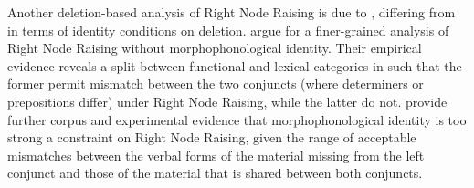 


%

Another deletion-based analysis of Right Node Raising is due to \citet{Abeille2016, Shiraishi2019},
differing from \citet{Chaves2014} in terms of identity conditions on deletion. \citet{Abeille2016}
argue for a finer-grained analysis of  Right Node Raising without morphophonological
identity. Their empirical evidence reveals a split between functional and lexical categories in
 such that the former permit mismatch between the two conjuncts (where determiners or
prepositions differ) under Right Node Raising, while the latter do not. \citet{Shiraishi2019}
provide further corpus and experimental evidence that morphophonological identity is too strong a
constraint on Right Node Raising, given the range of acceptable mismatches between the verbal forms
of the material missing from the left conjunct and those of the material that is shared between both
conjuncts.%



